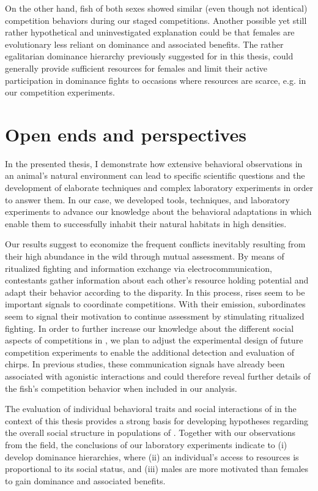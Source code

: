 On the other hand, fish of both sexes showed similar (even though not identical) competition behaviors during our staged competitions. Another possible yet still rather hypothetical and uninvestigated explanation could be that females are evolutionary less reliant on dominance and associated benefits. The rather egalitarian dominance hierarchy previously suggested for \lepto{} in this thesis, could generally provide sufficient resources for females and limit their active participation in dominance fights to occasions where resources are scarce, e.g. in our competition experiments.

\section{Open ends and perspectives}

In the presented thesis, I demonstrate how extensive behavioral observations in an animal's natural environment can lead to specific scientific questions and the development of elaborate techniques and complex laboratory experiments in order to answer them. In our case, we developed tools, techniques, and laboratory experiments to advance our knowledge about the behavioral adaptations in \lepto{} which enable them to successfully inhabit their natural habitats in high densities.

Our results suggest \lepto{} to economize the frequent conflicts inevitably resulting from their high abundance in the wild through mutual assessment. By means of ritualized fighting and information exchange via electrocommunication, contestants gather information about each other's resource holding potential and adapt their behavior according to the disparity. In this process, rises seem to be important signals to coordinate competitions. With their emission, subordinates seem to signal their motivation to continue assessment by stimulating ritualized fighting. In order to further increase our knowledge about the different social aspects of competitions in \lepto{}, we plan to adjust the experimental design of future competition experiments to enable the additional detection and evaluation of chirps. In previous studies, these communication signals have already been associated with agonistic interactions and could therefore reveal further details of the fish's competition behavior when included in our analysis. 

The evaluation of individual behavioral traits and social interactions of \lepto{} in the context of this thesis provides a strong basis for developing hypotheses regarding the overall social structure in populations of \lepto{}. Together with our observations from the field, the conclusions of our laboratory experiments indicate \lepto{} to (i) develop dominance hierarchies, where (ii) an individual's access to resources is proportional to its social status, and (iii) males are more motivated than females to gain dominance and associated benefits.

